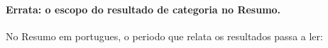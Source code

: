 %
%
%
%

\paragraph*{Errata: o escopo do resultado de categoria no Resumo.}
No Resumo em portugues, o periodo que relata os resultados passa a ler:

